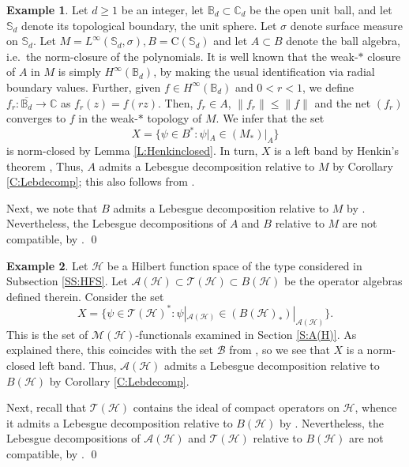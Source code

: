\documentclass[10pt]{amsart}
\newcommand{\bB}{{\mathbb{B}}}
\newcommand{\bC}{{\mathbb{C}}}
\newcommand{\bS}{{\mathbb{S}}}
\newcommand{\A}{{\mathcal{A}}}
\renewcommand{\H}{{\mathcal{H}}}
\newcommand{\M}{{\mathcal{M}}}
\newcommand{\T}{{\mathcal{T}}}
\newcommand{\rC}{\mathrm{C}}
\newcommand{\ol}{\overline}
\theoremstyle{definition}
\newtheorem{example}{Example}
\begin{document}
\begin{example}\label{E:ballalg}
Let $d\geq 1$ be an integer, let $\bB_d\subset\bC_d$ be the open unit ball, and let $\bS_d$ denote its topological boundary, the unit sphere. Let $\sigma$ denote surface measure on $\bS_d$. Let $M=L^\infty(\bS_d,\sigma), B=\rC(\bS_d)$ and let $A\subset B$ denote the ball algebra, i.e.\ the norm-closure of the polynomials. 
It is well known that the weak-$*$ closure of $A$ in $M$ is simply $H^\infty(\bB_d)$,  by making the usual identification via radial boundary values. Further, given $f\in H^\infty(\bB_d)$ and $0<r<1$, we define $f_r:\ol{\bB_d} \to \bC$ as $f_r(z)=f(rz)$. Then, $f_r\in A$, $\|f_r\|\leq \|f\|$ and the net $(f_r)$ converges to $f$ in the weak-$*$ topology of $M$. We infer that the set
\[
X=\{\psi\in B^*:\psi|_{A}\in (M_*)|_{A}\}
\]
is norm-closed by Lemma \ref{L:Henkinclosed}. In turn, $X$
is a left band by Henkin's theorem \cite[Theorem 9.3.1]{rudin2008}, 
Thus, $A$ admits a Lebesgue decomposition relative to $M$ by Corollary \ref{C:Lebdecomp}; this also follows from \cite[Section 9.8]{rudin2008}. 

Next, we note that  $B$ admits a Lebesgue decomposition relative to $M$ by  \cite[Lemma 3.4]{CH2025}. Nevertheless, the Lebesgue decompositions of $A$ and $B$ relative to $M$ are not compatible, by \cite[Theorem 4.8 and Proposition 6.3]{CH2025}.  \qed
\end{example}


  
\begin{example}\label{E:AH}
Let $\H$ be a Hilbert function space of the type considered  in Subsection \ref{SS:HFS}. Let $\A(\H)\subset \T(\H)\subset B(\H)$ be the operator algebras defined therein. Consider the set
\[
X=\{\psi\in \T(\H)^*:\psi|_{\A(\H)}\in (B(\H)_*)|_{\A(\H)}\}.
\]
This is the set of $\M(\H)$-functionals examined in Section \ref{S:A(H)}. As explained there, this coincides with the set $\mathscr{B}$  from  \cite[Theorem 5.7]{CT2023Henkin}, so we see that $X$ is a norm-closed left band.  Thus, $\A(\H)$ admits a Lebesgue decomposition relative to $B(\H)$ by Corollary \ref{C:Lebdecomp}. 

Next, recall that  $\T(\H)$ contains the ideal of compact operators on $\H$, whence it admits a Lebesgue decomposition relative to $B(\H)$ by  \cite[Lemma 3.4]{CH2025}. Nevertheless, the Lebesgue decompositions of 
$\A(\H)$ and $\T(\H)$ relative to $B(\H)$ are not compatible, by \cite[Theorem 4.8 and Proposition 6.1]{CH2025}.
\qed
\end{example}
\end{document}
